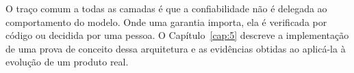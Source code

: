 O traço comum a todas as camadas é que a confiabilidade não é delegada ao comportamento do modelo. Onde uma garantia importa, ela é verificada por código ou decidida por uma pessoa. O Capítulo~\ref{cap:5} descreve a implementação de uma prova de conceito dessa arquitetura e as evidências obtidas ao aplicá-la à evolução de um produto real.
